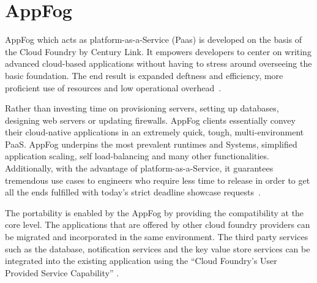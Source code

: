 \section{AppFog}
AppFog which acts as platform-as-a-Service (Paas) is developed on the
basis of the Cloud Foundry by Century Link. It empowers developers to center
on writing advanced cloud-based applications without having to stress
around overseeing the basic foundation. The end result is expanded
deftness and efficiency, more proficient use of resources and low
operational overhead~\cite{hid-sp18-412-century_link_appfog}.

Rather than investing time on  provisioning servers, setting up databases,
designing web servers or updating firewalls. AppFog clients essentially
convey their cloud-native applications in an extremely quick, tough,
multi-environment PaaS. AppFog underpins the most prevalent runtimes and
Systems, simplified application scaling, self load-balancing and
many other functionalities. Additionally, with the advantage of
platform-as-a-Service, it guarantees tremendous
use cases to engineers who require less time to release
in order to get all the ends fulfilled with today’s strict
deadline showcase requests~\cite{hid-sp18-412-century_link_appfog}.

The portability is enabled by the AppFog by providing the compatibility at
the core level. The applications that are offered by other cloud foundry 
providers can be migrated and incorporated in the same environment. 
The third party services such as the database, notification services 
and the key value store services can be integrated into the existing 
application using the “Cloud Foundry’s User Provided Service Capability”
\cite{hid-sp18-412-century_link_appfog}.

